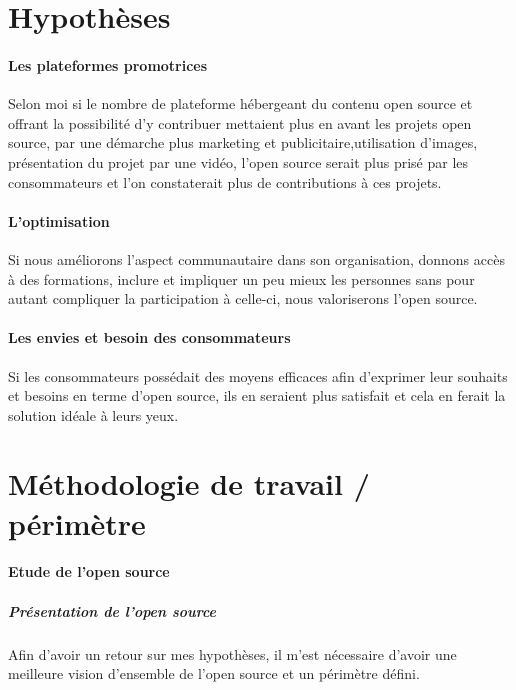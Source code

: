 	\section{Hypothèses}

		\paragraph{Les plateformes promotrices\\}

			Selon moi si le nombre de plateforme hébergeant du contenu open source et offrant la possibilité d'y contribuer mettaient plus en avant les projets open source, par une démarche plus marketing et publicitaire,utilisation d'images, présentation du projet par une vidéo, l'open source serait plus prisé par les consommateurs et l'on constaterait plus de contributions à ces projets.

		\paragraph{L'optimisation\\}

			Si nous améliorons l'aspect communautaire dans son organisation, donnons accès à des formations, inclure et impliquer un peu mieux les personnes sans pour autant compliquer la participation à celle-ci, nous valoriserons l'open source.

		\paragraph{Les envies et besoin des consommateurs\\}

			Si les consommateurs possédait des moyens efficaces afin d'exprimer leur souhaits et besoins en terme d'open source, ils en seraient plus satisfait et cela en ferait la solution idéale à leurs yeux.

	\section{Méthodologie de travail / périmètre}
		\paragraph{Etude de l'open source}

			\subparagraph{Présentation de l'open source\\}

				Afin d'avoir un retour sur mes hypothèses, il m'est nécessaire d'avoir une meilleure vision d'ensemble de l'open source et un périmètre défini.

